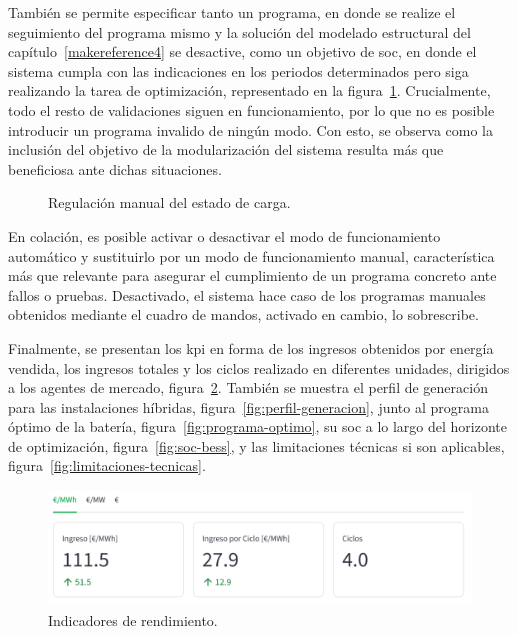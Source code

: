   También se permite especificar tanto un programa, en donde se realize el seguimiento del programa mismo y la solución del modelado estructural del capítulo~\ref{makereference4} se desactive, como un objetivo de \gls{soc}, en donde el sistema cumpla con las indicaciones en los periodos determinados pero siga realizando la tarea de optimización, representado en la figura~\ref{fig:soc-manual}. Crucialmente, todo el resto de validaciones siguen en funcionamiento, por lo que no es posible introducir un programa invalido de ningún modo. Con esto, se observa como la inclusión del objetivo de la modularización del sistema resulta más que beneficiosa ante dichas situaciones.

  \begin{figure}
    \centering
    \caption[Regulación manual del estado de carga.]{Regulación manual del estado de carga.}
    \label{fig:soc-manual}
  \end{figure}

  En colación, es posible activar o desactivar el modo de funcionamiento automático y sustituirlo por un modo de funcionamiento manual, característica más que relevante para asegurar el cumplimiento de un programa concreto ante fallos o pruebas. Desactivado, el sistema hace caso de los programas manuales obtenidos mediante el cuadro de mandos, activado en cambio, lo sobrescribe.

  Finalmente, se presentan los \gls{kpi} en forma de los ingresos obtenidos por energía vendida, los ingresos totales y los ciclos realizado en diferentes unidades, dirigidos a los agentes de mercado, figura~\ref{fig:kpi-sistema}. También se muestra el perfil de generación para las instalaciones híbridas, figura~\ref{fig:perfil-generacion}, junto al programa óptimo de la batería, figura~\ref{fig:programa-optimo}, su \gls{soc} a lo largo del horizonte de optimización, figura~\ref{fig:soc-bess}, y las limitaciones técnicas si son aplicables, figura~\ref{fig:limitaciones-tecnicas}.

  \begin{figure}
    \centering
    \includegraphics[width=0.75\linewidth]{figures/kpi-sistema.png}
    \caption[Indicadores de rendimiento.]{Indicadores de rendimiento.}
    \label{fig:kpi-sistema}
  \end{figure}

